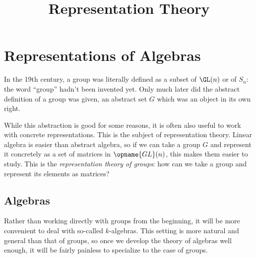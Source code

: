 \documentclass[11pt]{scrreprt}
\begin{document}
\title{Representation Theory}
\maketitle

\chapter{Representations of Algebras}
In the 19th century, a group was literally defined
as a subset of $\GL(n)$ or of $S_n$: the word ``group'' hadn't been invented yet.
Only much later did the abstract definition of a group was given,
an abstract set $G$ which was an object in its own right.

While this abstraction is good for some reasons,
it is often also useful to work with concrete representations.
This is the subject of representation theory.
Linear algebra is easier than abstract algebra,
so if we can take a group $G$ and represent it concretely
as a set of matrices in $\opname{GL}(n)$,
this makes them easier to study.
This is the \emph{representation theory of groups}:
how can we take a group and represent its elements as matrices?

\section{Algebras}
Rather than working directly with groups from the beginning,
it will be more convenient to deal with so-called $k$-algebras.
This setting is more natural and general than that of groups,
so once we develop the theory of algebras well enough,
it will be fairly painless to specialize to the case of groups.
\end{document}
